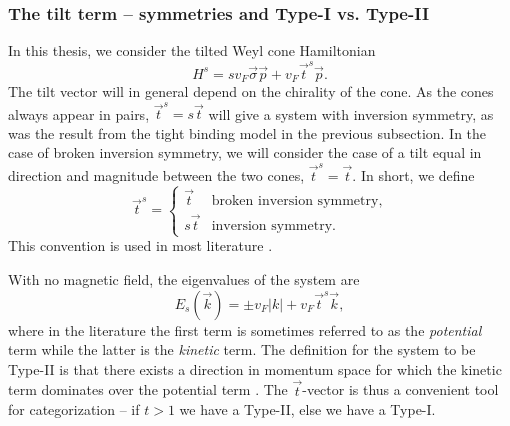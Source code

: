\subsubsection{The tilt term -- symmetries and Type-I vs.\! Type-II}
In this thesis, we consider the tilted Weyl cone Hamiltonian
\[
H^s = s v_F \vec{\sigma} \vec{p} + v_F \vec{t}^s \vec{p}.
\]
The tilt vector will in general depend on the chirality of the cone.
As the cones always appear in pairs, \( \vec{t}^s = s \vec{t} \) will give a system with inversion symmetry, as was the result from the tight binding model in the previous subsection.
In the case of broken inversion symmetry, we will consider the case of a tilt equal in direction and magnitude between the two cones, \( \vec{t}^s = \vec{t} \).
In short, we define
\begin{equation}
  \vec{t}^s =
  \begin{cases}
    \vec{t} & \text{broken inversion symmetry},\\
    s \vec{t} & \text{inversion symmetry}.
  \end{cases}\label{eq:11}
\end{equation}
This convention is used in most literature \cite{vanderwurffMagnetovorticalThermoelectricTransport2019,ferreirosAnomalousNernstThermal2017}.

With no magnetic field, the eigenvalues of the system are
\begin{equation}
  \label{eq:12}
  E_s(\vec{k})
  = \pm v_F |k| + v_F \vec{t}^s \vec{k},
\end{equation}
where in the literature the first term is sometimes referred to as the \emph{potential} term while the latter is the \emph{kinetic} term.
The definition for the system to be Type-II is that there exists a direction in momentum space for which the kinetic term dominates over the potential term \cite{soluyanovTypeIIWeylSemimetals2015}.
The \(\vec{t}\)-vector is thus a convenient tool for categorization -- if \(t > 1\) we have a Type-II, else we have a Type-I.


